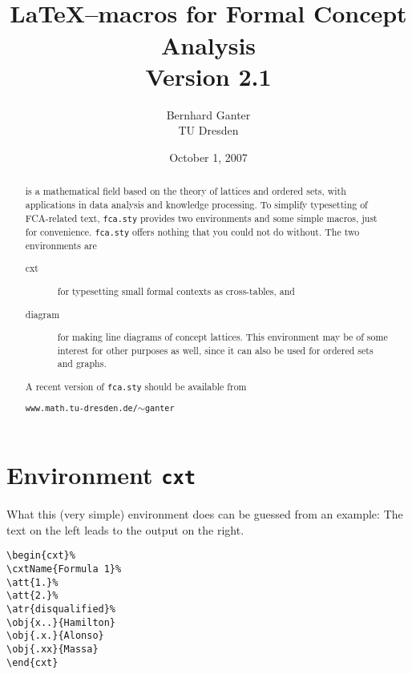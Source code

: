 \documentclass[12pt]{article}
\title{\fcastyle\\\LaTeX--macros for Formal Concept Analysis\\
{ Version 2.1}}
\author{Bernhard Ganter\\ TU Dresden}
\date{October 1, 2007}
\def\fcastyle{\texttt{fca.sty}\xspace}
\begin{document}
\maketitle
\begin{abstract}
\FCA is a mathematical field based on the theory of lattices and ordered
sets, with applications in data analysis and knowledge processing. 
To simplify typesetting of FCA-related text, \fcastyle  provides two
environments and some simple macros, just for convenience. \fcastyle offers
nothing that you could not do without. The two environments are
\begin{description}
\item[cxt] for typesetting small formal contexts as cross-tables, and
\item [diagram] for making line diagrams of concept lattices. This environment
  may be of some interest for other purposes as well, since it can also be
  used for ordered sets and graphs.
\end{description}
A recent version of \texttt{fca.sty} should be available from
\begin{center}
  \texttt{www.math.tu-dresden.de/$\sim$ganter}
\end{center}
\end{abstract}
%
%
\tableofcontents

\section{Environment \texttt{cxt}}
What this (very simple) environment does can be guessed from an example:
The text on the left leads to the output on the right.\bigbreak

\noindent\begin{minipage}{.45\textwidth}
\begin{verbatim}
\begin{cxt}%
\cxtName{Formula 1}%
\att{1.}%
\att{2.}%
\atr{disqualified}%
\obj{x..}{Hamilton}
\obj{.x.}{Alonso}
\obj{.xx}{Massa}
\end{cxt}
\end{verbatim}
\end{minipage}
\hfill
\begin{minipage}{.40\textwidth}
\begin{cxt}%
%
%
%
%
\end{cxt}
\end{minipage}
\bigbreak
\end{document}
